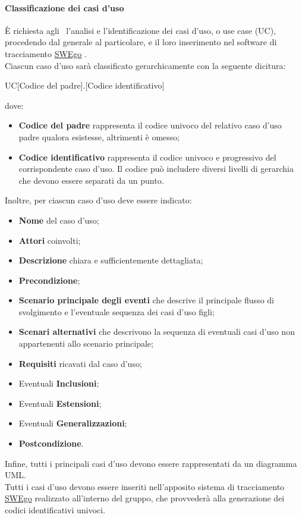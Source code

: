 \documentclass[../NormeDiProgetto.tex]{subfiles}
\begin{document}
			\paragraph{Classificazione dei casi d'uso\\}
				È richiesta agli \analisti\ l'analisi e l'identificazione dei casi d'uso, o use case (UC), procedendo dal generale al particolare,
				e il loro inserimento nel software di tracciamento \hyperlink{SWEgo}{SWEgo} .\\
				Ciascun caso d'uso sarà classificato gerarchicamente con la seguente dicitura:
				\begin{center}
					UC[Codice del padre].[Codice identificativo]
				\end{center}
				dove:
				\begin{itemize}
					\item \textbf{Codice del padre} rappresenta il codice univoco
					del relativo caso d'uso padre qualora esistesse, altrimenti è omesso;
					\item \textbf{Codice identificativo} rappresenta il codice
					univoco e progressivo del corrispondente caso d'uso. Il codice
					può includere diversi livelli di gerarchia che devono essere
					separati da un punto.
				\end{itemize}
				Inoltre, per ciascun caso d'uso deve essere indicato:
				\begin{itemize}
					\item \textbf{Nome} del caso d'uso;
					\item \textbf{Attori} coinvolti;
					\item \textbf{Descrizione} chiara e sufficientemente
					dettagliata;
					\item \textbf{Precondizione};
					\item \textbf{Scenario principale degli eventi} che descrive il principale flusso di svolgimento e l'eventuale sequenza dei casi d'uso figli;
					\item \textbf{Scenari alternativi} che descrivono la sequenza
					di eventuali casi d'uso non appartenenti allo scenario
					principale;
					\item \textbf{Requisiti} ricavati dal caso d'uso;
					\item Eventuali \textbf{Inclusioni};
					\item Eventuali \textbf{Estensioni};
					\item Eventuali \textbf{Generalizzazioni};
					\item \textbf{Postcondizione}.
				\end{itemize}
				Infine, tutti i principali casi d'uso devono essere rappresentati da un diagramma UML.\\
				Tutti i casi d'uso devono essere inseriti nell'apposito sistema di tracciamento \hyperlink{SWEgo}{SWEgo} 
				realizzato all'interno del gruppo, che provvederà alla generazione
				dei codici identificativi univoci.
				
\end{document}
